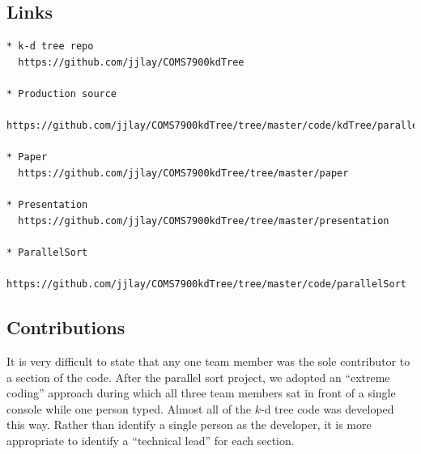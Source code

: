 \documentclass{article}
\begin{document}
%
%

\subsection{Links}

\begin{verbatim}
* k-d tree repo
  https://github.com/jjlay/COMS7900kdTree

* Production source
  https://github.com/jjlay/COMS7900kdTree/tree/master/code/kdTree/parallelApproved

* Paper
  https://github.com/jjlay/COMS7900kdTree/tree/master/paper

* Presentation
  https://github.com/jjlay/COMS7900kdTree/tree/master/presentation
  
* ParallelSort
  https://github.com/jjlay/COMS7900kdTree/tree/master/code/parallelSort
\end{verbatim}

\subsection{Contributions}

It is very difficult to state that any one team member was the sole contributor to a section of the code. After the parallel sort project, we adopted an ``extreme coding'' approach during which all three team members sat in front of a single console while one person typed. Almost all of the $k$-d tree code was developed this way. Rather than identify a single person as the developer, it is more appropriate to identify a ``technical lead'' for each section. \\
\end{document}
